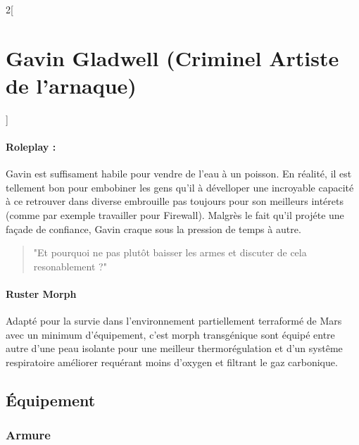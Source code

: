 \documentclass[a4paper,9pt]{article}
\begin{document}
\begin{multicols}{2}[\section*{Gavin Gladwell (Criminel Artiste de l'arnaque)}]
   \paragraph{Roleplay :}
   Gavin est suffisament habile pour vendre de l'eau à un poisson.
   En réalité, il est tellement bon pour embobiner les gens qu'il à dévelloper
   une incroyable capacité à ce retrouver dans diverse embrouille pas toujours
   pour son meilleurs intérets (comme par exemple travailler pour Firewall).
   Malgrès le fait qu'il projéte une façade de confiance, Gavin craque sous
   la pression de temps à autre.

   \begin{quote}
      "Et pourquoi ne pas plutôt baisser les armes et discuter de cela
      resonablement ?"
   \end{quote}

   \paragraph{Ruster Morph}
   Adapté pour la survie dans l'environnement partiellement terraformé de Mars
   avec un minimum d'équipement, c'est morph transgénique sont équipé entre autre
   d'une peau isolante pour une meilleur thermorégulation et d'un systême
   respiratoire améliorer requérant moins d'oxygen et filtrant le gaz
   carbonique. 

   \subsection*{Équipement}

   \subsubsection*{Armure}


\end{multicols}
\end{document}
